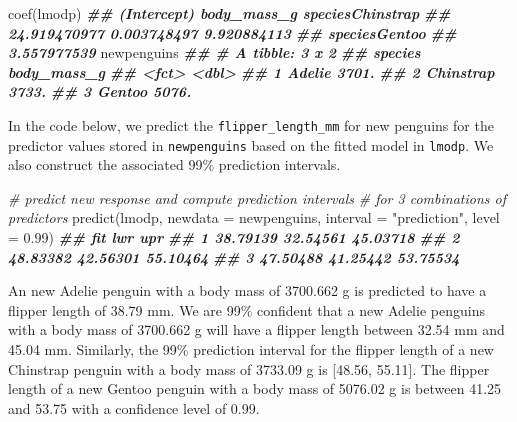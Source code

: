 \documentclass[
]{book}
\newenvironment{Shaded}{\begin{snugshade}}{\end{snugshade}}
\newcommand{\AttributeTok}[1]{\textcolor[rgb]{0.77,0.63,0.00}{#1}}
\newcommand{\CommentTok}[1]{\textcolor[rgb]{0.56,0.35,0.01}{\textit{#1}}}
\newcommand{\DocumentationTok}[1]{\textcolor[rgb]{0.56,0.35,0.01}{\textbf{\textit{#1}}}}
\newcommand{\FloatTok}[1]{\textcolor[rgb]{0.00,0.00,0.81}{#1}}
\newcommand{\FunctionTok}[1]{\textcolor[rgb]{0.00,0.00,0.00}{#1}}
\newcommand{\NormalTok}[1]{#1}
\newcommand{\StringTok}[1]{\textcolor[rgb]{0.31,0.60,0.02}{#1}}
\theoremstyle{definition}
\theoremstyle{definition}
\theoremstyle{definition}
\theoremstyle{definition}
\theoremstyle{remark}
\begin{document}
\begin{Shaded}
\begin{Highlighting}[]
\FunctionTok{coef}\NormalTok{(lmodp)}
\DocumentationTok{\#\#      (Intercept)      body\_mass\_g speciesChinstrap }
\DocumentationTok{\#\#     24.919470977      0.003748497      9.920884113 }
\DocumentationTok{\#\#    speciesGentoo }
\DocumentationTok{\#\#      3.557977539}
\NormalTok{newpenguins}
\DocumentationTok{\#\# \# A tibble: 3 x 2}
\DocumentationTok{\#\#   species   body\_mass\_g}
\DocumentationTok{\#\#   \textless{}fct\textgreater{}           \textless{}dbl\textgreater{}}
\DocumentationTok{\#\# 1 Adelie          3701.}
\DocumentationTok{\#\# 2 Chinstrap       3733.}
\DocumentationTok{\#\# 3 Gentoo          5076.}
\end{Highlighting}
\end{Shaded}

In the code below, we predict the \texttt{flipper\_length\_mm} for new penguins for the predictor values stored in \texttt{newpenguins} based on the fitted model in \texttt{lmodp}. We also construct the associated 99\% prediction intervals.

\begin{Shaded}
\begin{Highlighting}[]
\CommentTok{\# predict new response and compute prediction intervals}
\CommentTok{\# for 3 combinations of predictors}
\FunctionTok{predict}\NormalTok{(lmodp, }\AttributeTok{newdata =}\NormalTok{ newpenguins,}
        \AttributeTok{interval =} \StringTok{"prediction"}\NormalTok{, }\AttributeTok{level =} \FloatTok{0.99}\NormalTok{)}
\DocumentationTok{\#\#        fit      lwr      upr}
\DocumentationTok{\#\# 1 38.79139 32.54561 45.03718}
\DocumentationTok{\#\# 2 48.83382 42.56301 55.10464}
\DocumentationTok{\#\# 3 47.50488 41.25442 53.75534}
\end{Highlighting}
\end{Shaded}

An new Adelie penguin with a body mass of 3700.662 g is predicted to have a flipper length of 38.79 mm. We are 99\% confident that a new Adelie penguins with a body mass of 3700.662 g will have a flipper length between 32.54 mm and 45.04 mm. Similarly, the 99\% prediction interval for the flipper length of a new Chinstrap penguin with a body mass of 3733.09 g is {[}48.56, 55.11{]}. The flipper length of a new Gentoo penguin with a body mass of 5076.02 g is between 41.25 and 53.75 with a confidence level of 0.99.
\end{document}
